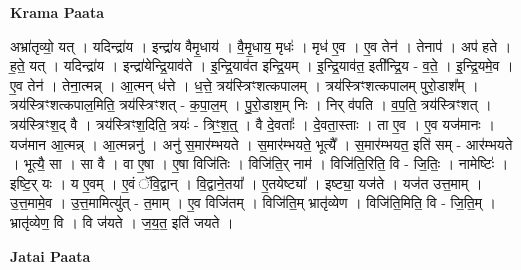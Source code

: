 \documentclass[17pt]{extarticle}
\begin{document}
\textbf{Krama Paata} \newline

अभ्रा॑तृव्यो॒ यत् । यदिन्द्रा॑य । इन्द्रा॑य वैमृ॒धाय॑ । वै॒मृ॒धाय॒ मृधः॑ । मृध॑ ए॒व । ए॒व तेन॑ । तेनाप॑ । अप॑ हते । ह॒ते॒ यत् । यदिन्द्रा॑य । इन्द्रा॑येन्द्रि॒याव॑ते । इ॒न्द्रि॒याव॑त इन्द्रि॒यम् । इ॒न्द्रि॒याव॑त॒ इती᳚न्द्रि॒य - व॒ते॒ । इ॒न्द्रि॒यमे॒व । ए॒व तेन॑ । तेना॒त्मन्न् । आ॒त्मन् ध॑त्ते । ध॒त्ते॒ त्रय॑स्त्रिꣳशत्कपालम् । त्रय॑स्त्रिꣳशत्कपालम् पुरो॒डाश᳚म् । त्रय॑स्त्रिꣳशत्कपाल॒मिति॒ त्रय॑स्त्रिꣳशत् - क॒पा॒ल॒म् । पु॒रो॒डाश॒म् निः । निर् व॑पति । व॒प॒ति॒ त्रय॑स्त्रिꣳशत् । त्रय॑स्त्रिꣳश॒द् वै । त्रय॑स्त्रिꣳश॒दिति॒ त्रयः॑ - त्रिꣳ॒॒श॒त्॒ । वै दे॒वताः᳚ । दे॒वता॒स्ताः । ता ए॒व । ए॒व यज॑मानः । यज॑मान आ॒त्मन्न् । आ॒त्मन्ननु॑ । अनु॑ स॒मार॑म्भयते । स॒मार॑म्भयते॒ भूत्यै᳚ । स॒मार॑म्भयत॒ इति॑ सम् - आर॑म्भयते । भूत्यै॒ सा । सा वै । वा ए॒षा । ए॒षा विजि॑तिः । विजि॑ति॒र् नाम॑ । विजि॑ति॒रिति॒ वि - जि॒तिः॒ । नामेष्टिः॑ । इष्टि॒र् यः । य ए॒वम् । ए॒वं ॅवि॒द्वान् । वि॒द्वाने॒तया᳚ । ए॒तयेष्ट्या᳚ । इष्ट्या॒ यज॑ते । यज॑त उत्त॒माम् । उ॒त्त॒मामे॒व । उ॒त्त॒मामित्यु॑त् - त॒माम् । ए॒व विजि॑तम् । विजि॑ति॒म् भ्रातृ॑व्येण । विजि॑ति॒मिति॒ वि - जि॒ति॒म् । भ्रातृ॑व्येण॒ वि । वि ज॑यते । ज॒य॒त॒ इति॑ जयते । \newline

\textbf{Jatai Paata} \newline
\end{document}
